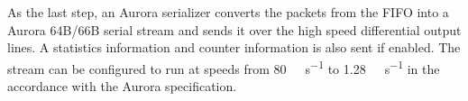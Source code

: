 As the last step, an Aurora serializer converts the packets from the FIFO into a Aurora 64B/66B serial stream and sends it over the high speed differential output lines. A statistics information and counter information is also sent if enabled. The stream can be configured to run at speeds from \SI{80}{\mega\bit\per\second} to \SI{1.28}{\giga\bit\per\second} in the accordance with the Aurora specification.



